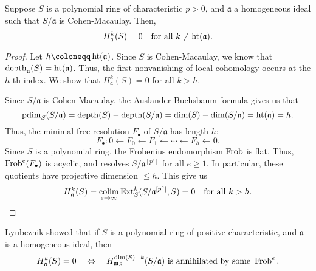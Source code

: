\documentclass[12pt]{article}
\begin{document}
\begin{thm} \label{thm:peskine-szpiro}
	Suppose $S$ is a polynomial ring of characteristic $p > 0$, and $\mathfrak{a}$ a homogeneous ideal such that $S/\mathfrak{a}$ is Cohen-Macaulay. Then,
	\begin{equation*} 
		H_{\mathfrak{a}}^{k}(S) = 0 \quad \text{for all } k \neq \operatorname{ht}(\mathfrak{a}).
	\end{equation*}
\end{thm}
\begin{proof} 
	Let $h \coloneqq \htt(\mathfrak{a})$. Since $S$ is Cohen-Macaulay, we know that $\operatorname{depth}_{\mathfrak{a}}(S) = \operatorname{ht}(\mathfrak{a})$. Thus, the first nonvanishing of local cohomology occurs at the $h$-th index. We show that $H_{\mathfrak{a}}^{k}(S) = 0$ for all $k > h$. 

	Since $S/\mathfrak{a}$ is Cohen-Macaulay, the Auslander-Buchsbaum formula gives us that 
	\begin{equation*} 
		\operatorname{pdim}_{S}(S/\mathfrak{a}) = \operatorname{depth}(S) - \operatorname{depth}(S/\mathfrak{a}) = \dim(S) - \dim(S/\mathfrak{a}) = \operatorname{ht}(\mathfrak{a}) = h.
	\end{equation*}
	Thus, the minimal free resolution $F_{\bullet}$ of $S/\mathfrak{a}$ has length $h$:
	\begin{equation*} 
		F_{\bullet} : 0 \leftarrow F_{0} \leftarrow F_{1} \leftarrow \cdots \leftarrow F_{h} \leftarrow 0.
	\end{equation*}
	Since $S$ is a polynomial ring, the Frobenius endomorphism $\operatorname{Frob}$ is flat. Thus, $\operatorname{Frob}^{e}(F_{\bullet})$ is acyclic, and resolves $S/\mathfrak{a}^{[p^{e}]}$ for all $e \ge 1$. In particular, these quotients have projective dimension $\le h$. This give us
	\begin{equation*} 
		H_{\mathfrak{a}}^{k}(S) = \operatorname*{colim}_{e \to \infty} \operatorname{Ext}_{S}^{k}(S/\mathfrak{a}^{\left[p^{e}\right]}, S) = 0 \quad \text{for all } k > h. \qedhere
	\end{equation*}
\end{proof}

\begin{rem}
	Lyubeznik \cite{LyubeznikVanishingLocalCohomologyPositive} showed that if $S$ is a polynomial ring of positive characteristic, and $\mathfrak{a}$ is a homogeneous ideal, then
	\begin{equation*} 
		H_{\mathfrak{a}}^{k}(S) = 0 \quad\Leftrightarrow\quad H_{\mathfrak{m}_{S}}^{\dim(S) - k}(S/\mathfrak{a}) \text{ is annihilated by some } \operatorname{Frob}^{e}.
	\end{equation*}
\end{rem}
\end{document}
